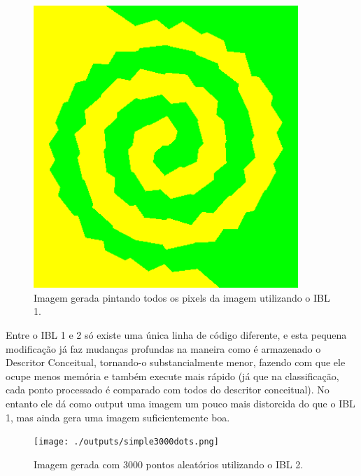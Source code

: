 \documentclass[12pt]{article}
\begin{document}
\begin{figure}[hb]
	\center
	\includegraphics[width=10cm]{./outputs/sequentialdouble.png}
	\caption{Imagem gerada pintando todos os pixels da imagem utilizando o IBL 1.}
\end{figure}
Entre o IBL 1 e 2 só existe uma única linha de código diferente, e esta pequena modificação já faz mudanças profundas na maneira como é armazenado o Descritor Conceitual, tornando-o substancialmente menor, fazendo com que ele ocupe menos memória e também execute mais rápido (já que na classificação, cada ponto processado é comparado com todos do descritor conceitual). No entanto ele dá como output uma imagem um pouco mais distorcida do que o IBL 1, mas ainda gera uma imagem suficientemente boa.


\begin{figure}[hb]
	\center
	\texttt{[image: ./outputs/simple3000dots.png]}
	\caption{Imagem gerada com 3000 pontos aleatórios utilizando o IBL 2.}
\end{figure}
\end{document}
